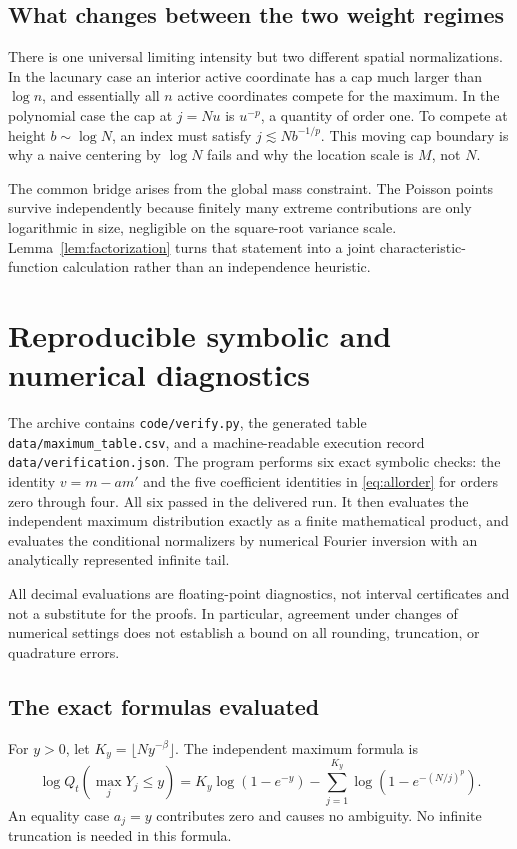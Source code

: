 \documentclass[11pt,a4paper]{article}
\numberwithin{equation}{section}
\theoremstyle{definition}
\theoremstyle{remark}
\begin{document}
\subsection{What changes between the two weight regimes}
There is one universal limiting intensity but two different spatial
normalizations. In the lacunary case an interior active coordinate has
a cap much larger than $\log n$, and essentially all $n$ active
coordinates compete for the maximum. In the polynomial case the cap
at $j=Nu$ is $u^{-p}$, a quantity of order one. To compete at height
$b\sim\log N$, an index must satisfy
$j\lesssim N b^{-1/p}$. This moving cap boundary is why a naive
centering by $\log N$ fails and why the location scale is $M$, not $N$.

The common bridge arises from the global mass constraint. The Poisson
points survive independently because finitely many extreme contributions
are only logarithmic in size, negligible on the square-root variance
scale. Lemma~\ref{lem:factorization} turns that statement into a joint
characteristic-function calculation rather than an independence heuristic.

\section{Reproducible symbolic and numerical diagnostics}
\label{sec:numerics}

The archive contains \texttt{code/verify.py}, the generated table
\texttt{data/maximum\_table.csv}, and a machine-readable execution record
\texttt{data/verification.json}. The program performs six exact symbolic
checks: the identity $v=m-am'$ and the five coefficient identities in
\eqref{eq:allorder} for orders zero through four. All six passed in the
delivered run. It then evaluates the independent maximum distribution
exactly as a finite mathematical product, and evaluates the conditional
normalizers by numerical Fourier inversion with an analytically
represented infinite tail.

All decimal evaluations are floating-point diagnostics, not interval
certificates and not a substitute for the proofs. In particular, agreement
under changes of numerical settings does not establish a bound on all
rounding, truncation, or quadrature errors.

\subsection{The exact formulas evaluated}
For $y>0$, let $K_y=\lfloor Ny^{-\beta}\rfloor$. The independent
maximum formula is
\begin{equation}
 \log Q_t(\max_jY_j\le y)
 =K_y\log(1-e^{-y})
   -\sum_{j=1}^{K_y}\log(1-e^{-(N/j)^p}).
 \label{eq:numericalQ}
\end{equation}
An equality case $a_j=y$ contributes zero and causes no ambiguity.
No infinite truncation is needed in this formula.
\end{document}
